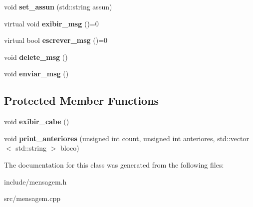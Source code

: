 \begin{DoxyCompactItemize}
void {\bfseries set\+\_\+assun} (std\+::string assun)
\item 
\mbox{\label{class_mensagem_a765e581056d82512f9ac24346485ba9d}} 
virtual void {\bfseries exibir\+\_\+msg} ()=0
\item 
\mbox{\label{class_mensagem_ab92e16079593cad22e32e013697814dc}} 
virtual bool {\bfseries escrever\+\_\+msg} ()=0
\item 
\mbox{\label{class_mensagem_a3f82c5185bed127efdb63b44bc663445}} 
void {\bfseries delete\+\_\+msg} ()
\item 
\mbox{\label{class_mensagem_ae0c87eab8b48b5d07c8b684f02a3690c}} 
void {\bfseries enviar\+\_\+msg} ()
\end{DoxyCompactItemize}
\subsection*{Protected Member Functions}
\begin{DoxyCompactItemize}
\item 
\mbox{\label{class_mensagem_a1dc03193f922c303bee9220cd7b5e042}} 
void {\bfseries exibir\+\_\+cabe} ()
\item 
\mbox{\label{class_mensagem_af08225cf40fa6854d0c79d0e6684a63a}} 
void {\bfseries print\+\_\+anteriores} (unsigned int count, unsigned int anteriores, std\+::vector$<$ std\+::string $>$ bloco)
\end{DoxyCompactItemize}


The documentation for this class was generated from the following files\+:\begin{DoxyCompactItemize}
\item 
include/mensagem.\+h\item 
src/mensagem.\+cpp\end{DoxyCompactItemize}
